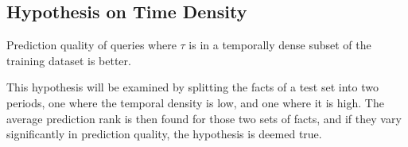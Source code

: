 \subsection{Hypothesis on Time Density}
\label{sec:hypothesis_time_density}

\begin{hypothesis}
\label{hyp:tiem_density}
Prediction quality of queries where $\tau$ is in a temporally dense subset of the training dataset is better.
\end{hypothesis}

This hypothesis will be examined by splitting the facts of a test set into two periods, one where the temporal density is low, and one where it is high. The average prediction rank is then found for those two sets of facts, and if they vary significantly in prediction quality, the hypothesis is deemed true.